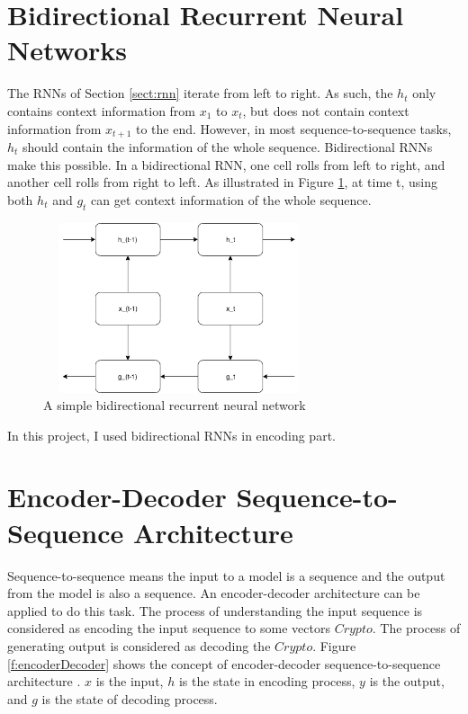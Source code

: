 \documentclass[modernstyle,12pt]{sjsuthesis}
\theoremstyle{definition}
\begin{document}
\section{Bidirectional Recurrent Neural Networks}

The RNNs of Section \ref{sect:rnn}
iterate from left to right. As such, the $h_t$ only contains context information from $x_1$ to $x_t$, but does not contain context information from $x_{t+1}$ to the end. However, in most sequence-to-sequence tasks, $h_t$ should contain the information of the whole sequence. Bidirectional RNNs make this possible. In a bidirectional RNN, one cell rolls from left to right, and another cell rolls from right to left. As illustrated in Figure \ref{f:bidirectionalRnn}, at time t, using both $h_t$ and $g_t$ can get context information of the whole sequence.

\begin{figure}[htbp]\centering
  \includegraphics[width=8cm, height=5cm]{figures/bidirectionalRnn.png}
  \caption{A simple bidirectional recurrent neural network}
  \label{f:bidirectionalRnn}
\end{figure}

In this project, I used bidirectional RNNs in encoding part.

\section{Encoder-Decoder Sequence-to-Sequence Architecture}

Sequence-to-sequence means the input to a model is a sequence and the output from the model is also a sequence. An encoder-decoder architecture can be applied to do this task. The process of understanding the input sequence is considered as encoding the input sequence to some vectors $Crypto$. The process of generating output is considered as decoding the $Crypto$. Figure \ref{f:encoderDecoder} shows the concept of encoder-decoder sequence-to-sequence architecture . $x$ is the input, $h$ is the state in encoding process, $y$ is the output, and $g$ is the state of decoding process.
\end{document}
